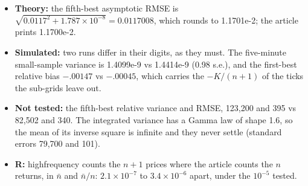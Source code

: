 \begin{itemize}
  \item \textbf{Theory:} the fifth-best asymptotic RMSE is $\sqrt{0.0117^2+1.787\times10^{-8}}=0.0117008$, which
    rounds to 1.1701e-2; the article prints 1.1700e-2.
  \item \textbf{Simulated:} two runs differ in their digits, as they must. The five-minute small-sample variance is
    1.4099e-9 vs 1.4414e-9 (0.98 s.e.), and the first-best relative bias $-.00147$ vs $-.00045$, which carries the
    $-K/(n+1)$ of the ticks the sub-grids leave out.
  \item \textbf{Not tested:} the fifth-best relative variance and RMSE, 123,200 and 395 vs 82,502 and 340. The integrated
    variance has a Gamma law of shape 1.6, so the mean of its inverse square is infinite and they never settle
    (standard errors 79,700 and 101).
  \item \textbf{R:} highfrequency counts the $n+1$ prices where the article counts the $n$ returns, in $\bar n$ and
    $\bar n/n$: $2.1\times10^{-7}$ to $3.4\times10^{-6}$ apart, under the $10^{-5}$ tested.
\end{itemize}

